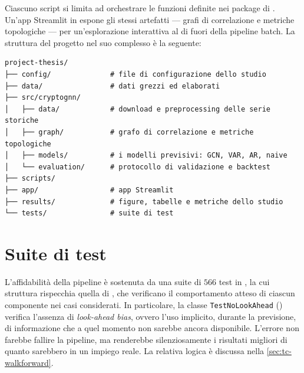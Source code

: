 Ciascuno script si limita ad orchestrare le funzioni definite nei package di . Un'app Streamlit in  espone gli stessi artefatti — grafi di correlazione e metriche topologiche — per un'esplorazione interattiva al di fuori della pipeline batch. La struttura del progetto nel suo complesso è la seguente:

\begin{Verbatim}[frame=single, fontsize=\footnotesize]
project-thesis/
├── config/              # file di configurazione dello studio
├── data/                # dati grezzi ed elaborati
├── src/cryptognn/
│   ├── data/            # download e preprocessing delle serie storiche
│   ├── graph/           # grafo di correlazione e metriche topologiche
│   ├── models/          # i modelli previsivi: GCN, VAR, AR, naive
│   └── evaluation/      # protocollo di validazione e backtest
├── scripts/
├── app/                 # app Streamlit
├── results/             # figure, tabelle e metriche dello studio
└── tests/               # suite di test
\end{Verbatim}

\section{Suite di test}
\label{sec:project-tests}

\begin{sloppypar}
L'affidabilità della pipeline è sostenuta da una suite di $566$ test in , la cui struttura rispecchia quella di , che verificano il comportamento atteso di ciascun componente nei casi considerati. In particolare, la classe \texttt{TestNoLookAhead} () verifica l'assenza di \emph{look-ahead bias}, ovvero l'uso implicito, durante la previsione, di informazione che a quel momento non sarebbe ancora disponibile. L'errore non farebbe fallire la pipeline, ma renderebbe silenziosamente i risultati migliori di quanto sarebbero in un impiego reale. La relativa logica è discussa nella \cref{sec:tc-walkforward}.
\end{sloppypar}

\let\thesection\oldthesection
\let\theHsection\oldtheHsection
